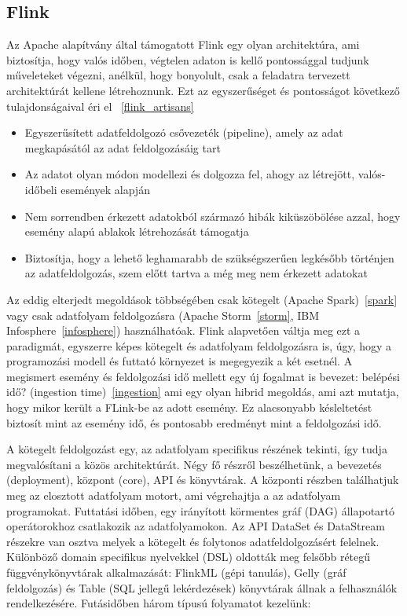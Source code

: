 \documentclass[a4paper,12pt]{article}
\begin{document}
\subsection{Flink}
Az Apache alapítvány által támogatott Flink egy olyan architektúra, ami biztosítja, hogy valós időben, végtelen adaton is kellő pontossággal tudjunk műveleteket végezni, anélkül, hogy bonyolult, csak a feladatra tervezett architektúrát kellene létrehoznunk. Ezt az egyszerűséget és pontosságot következő tulajdonságaival éri el ~\ref{flink_artisans}
\begin{itemize}
\item Egyszerűsített adatfeldolgozó csővezeték (pipeline), amely az adat megkapásától az adat feldolgozásáig tart
\item Az adatot olyan módon modellezi és dolgozza fel, ahogy az létrejött, valós-időbeli események alapján
\item Nem sorrendben érkezett adatokból származó hibák kiküszöbölése azzal, hogy esemény alapú ablakok létrehozását támogatja
\item Biztosítja, hogy a lehető leghamarabb de szükségszerűen legkésőbb történjen az adatfeldolgozás, szem előtt tartva a még meg nem érkezett adatokat
\end{itemize}

Az eddig elterjedt megoldások többségében csak kötegelt (Apache Spark)~\ref{spark} vagy csak adatfolyam feldolgozásra (Apache Storm~\ref{storm}, IBM Infosphere~\ref{infosphere}) használhatóak. Flink alapvetően váltja meg ezt a paradigmát, egyszerre képes kötegelt és adatfolyam feldolgozásra is, úgy, hogy a programozási modell és futtató környezet is megegyezik a két esetnél. A megismert esemény és feldolgozási idő mellett egy új fogalmat is bevezet: belépési idő? (ingestion time)~\ref{ingestion} ami egy olyan hibrid megoldás, ami azt mutatja, hogy mikor került a FLink-be az adott esemény.
Ez alacsonyabb késleltetést biztosít mint az esemény idő, és pontosabb eredményt mint a feldolgozási idő. \linebreak

A kötegelt feldolgozást egy, az adatfolyam specifikus részének tekinti, így tudja megvalósítani a közös architektúrát. Négy fő részről beszélhetünk, a bevezetés (deployment), központ (core), API és könyvtárak. A központi részben találhatjuk meg az elosztott adatfolyam motort, ami végrehajtja a az adatfolyam programokat. Futtatási időben, egy irányított körmentes gráf (DAG) állapotartó operátorokhoz csatlakozik az adatfolyamokon. Az API DataSet és DataStream részekre van osztva melyek a kötegelt és folytonos adatfeldolgozásért felelnek. Különböző domain specifikus nyelvekkel (DSL) oldották meg felsőbb rétegű függvénykönyvtárak alkalmazását: FlinkML (gépi tanulás), Gelly (gráf feldolgozás) és Table (SQL jellegű lekérdezések) könyvtárak állnak a felhasználók rendelkezésére.  Futásidőben három típusú folyamatot kezelünk:
 
\end{document}
